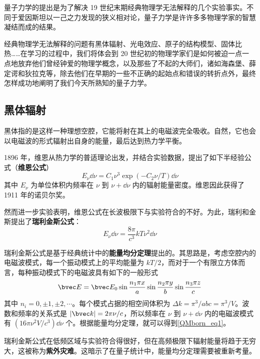 
量子力学的提出是为了解决 19 世纪末期经典物理学无法解释的几个实验事实。不同于爱因斯坦以一己之力发现的狭义相对论，量子力学是许许多多物理学家的智慧凝结而成的结果。

经典物理学无法解释的问题有黑体辐射、光电效应、原子的结构模型、固体比热……在学习的过程中，我们将体会到 20 世纪初的物理学家们是如何被迫一点一点地放弃他们曾经钟爱的物理学概念，以及那些了不起的大师们，诸如海森堡、薛定谔和狄拉克等，除去他们在早期的一些不正确的起始点和错误的转折点外，最终怎样成功地阐明了我们今天所熟知的量子力学。

\subsection{黑体辐射}
黑体指的是这样一种理想空腔，它能将射在其上的电磁波完全吸收。自然，它也会以电磁波的形式辐射出自身的能量，最后达到热力学平衡。

1896 年，维恩从热力学的普适理论出发，并结合实验数据，提出了如下半经验公式（\textbf{维恩公式}）
\begin{equation}
E_\nu \dd \nu=C_1\nu^3 \exp(-C_2 \nu /T) \dd \nu
\end{equation}
其中 $E_\nu$ 为单位体积内频率在 $\nu$ 到 $\nu+\dd \nu$ 内的辐射能量密度。维恩因此获得了 1911 年的诺贝尔奖。

然而进一步实验表明，维恩公式在长波极限下与实验符合的不好。为此，瑞利和金斯提出了\textbf{瑞利金斯公式}：
\begin{equation}\label{QMborn_eq1}
E_\nu \dd \nu=\frac{8\pi}{c^3}kT\nu^2 \dd \nu
\end{equation}

瑞利金斯公式是基于经典统计中的\textbf{能量均分定理}提出的。其思路是，考虑空腔内的电磁波模式，每一个振动模式上的平均能量为 $kT/2$，而对于一个有限立方体而言，每种振动模式下的电磁波具有如下的一般形式
\begin{equation}
\bvec E=\bvec E_0 \sin\frac{n_1\pi x}{a} \sin\frac{n_2\pi y}{b}\sin \frac{n_3\pi z}{c}
\end{equation}
其中 $n_i=0,\pm 1,\pm 2,\cdots$。每个模式占据的相空间体积为 $\Delta k=\pi^3/abc=\pi^3/V$。波数和频率的关系式是 $|\bvec k| = 2\pi\nu/c$，所以频率在 $\nu$ 到 $\nu+\dd \nu$ 内的电磁波模式有 $(16\pi \nu^2V/c^3 )\dd \nu$ 个。根据能量均分定理，就可以得到\autoref{QMborn_eq1}。

瑞利金斯公式在低频区域与实验符合得很好，但在高频极限下辐射能量将趋于无穷大，这被称为\textbf{紫外灾难}。这暗示了在量子统计中，能量均分定理需要被重新考量。

